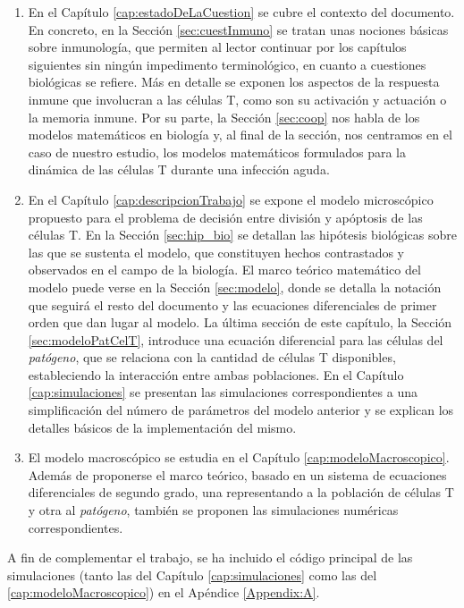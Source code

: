 \begin{enumerate}
	\item En el Capítulo \ref{cap:estadoDeLaCuestion} se cubre el contexto del documento. En concreto, en la Sección \ref{sec:cuestInmuno} se tratan unas nociones básicas sobre inmunología, que permiten al lector continuar por los capítulos siguientes sin ningún impedimento terminológico, en cuanto a cuestiones biológicas se refiere. Más en detalle se exponen los aspectos de la respuesta inmune que involucran a las células T, como son su activación y actuación o la memoria inmune. Por su parte, la Sección \ref{sec:coop} nos habla de los modelos matemáticos en biología y, al final de la sección, nos centramos en el caso de nuestro estudio, los modelos matemáticos formulados para la dinámica de las células T durante una infección aguda. 
	
	\item En el Capítulo \ref{cap:descripcionTrabajo} se expone el modelo microscópico propuesto para el problema de decisión entre división y apóptosis de las células T. En la Sección \ref{sec:hip_bio} se detallan las hipótesis biológicas sobre las que se sustenta el modelo, que constituyen hechos contrastados y observados en el campo de la biología. El marco teórico matemático del modelo puede verse en la Sección \ref{sec:modelo}, donde se detalla la notación que seguirá el resto del documento y las ecuaciones diferenciales de primer orden que dan lugar al modelo. La última sección de este capítulo, la Sección \ref{sec:modeloPatCelT}, introduce una ecuación diferencial para las células del \textit{patógeno}, que se relaciona con la cantidad de células T disponibles, estableciendo la interacción entre ambas poblaciones. En el Capítulo \ref{cap:simulaciones} se presentan las simulaciones correspondientes a una simplificación del número de parámetros del modelo anterior y se explican los detalles básicos de la implementación del mismo.
	
	\item El modelo macroscópico se estudia en el Capítulo \ref{cap:modeloMacroscopico}. Además de proponerse el marco teórico, basado en un sistema de ecuaciones diferenciales de segundo grado, una representando a la población de células T y otra al \textit{patógeno}, también se proponen las simulaciones numéricas correspondientes. 
\end{enumerate}

A fin de complementar el trabajo, se ha incluido el código principal de las simulaciones (tanto las del Capítulo \ref{cap:simulaciones} como las del \ref{cap:modeloMacroscopico}) en el Apéndice \ref{Appendix:A}.






